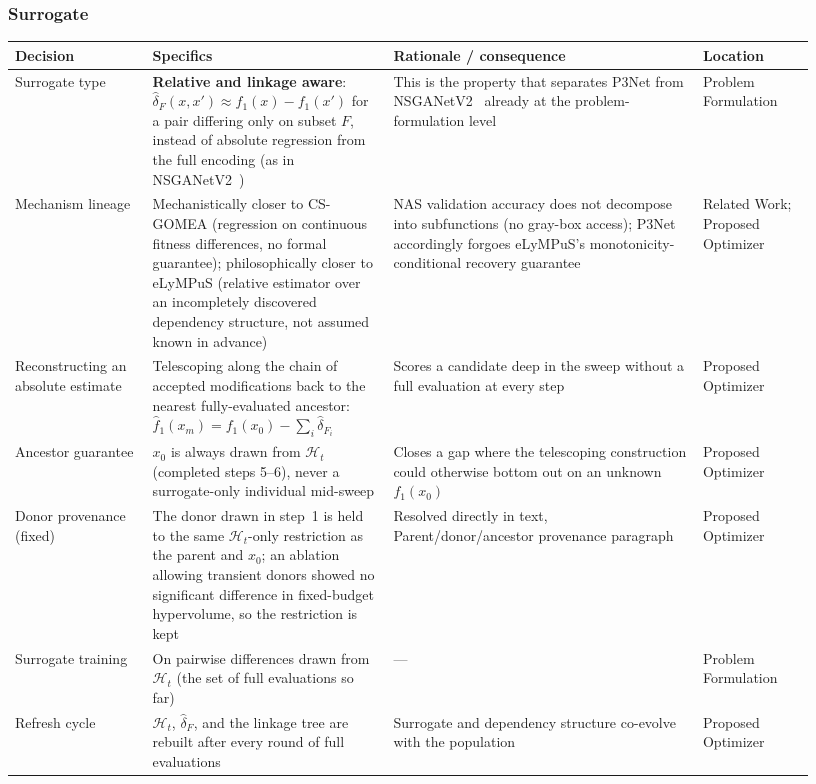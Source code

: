 \subsubsection*{Surrogate}
\begin{longtable}{p{0.16\linewidth} p{0.28\linewidth} p{0.36\linewidth} p{0.13\linewidth}}
\toprule
\textbf{Decision} & \textbf{Specifics} & \textbf{Rationale / consequence} & \textbf{Location} \\
\midrule
\endhead
Surrogate type & \textbf{Relative and linkage aware}: $\hat{\delta}_F(x,x')\approx f_1(x)-f_1(x')$ for a pair differing only on subset $F$, instead of absolute regression from the full encoding (as in NSGANetV2~\citep{lu2020nsganetv2}) & This is the property that separates P3Net from NSGANetV2~\citep{lu2020nsganetv2} already at the problem-formulation level & Problem Formulation \\
Mechanism lineage & Mechanistically closer to CS-GOMEA (regression on continuous fitness differences, no formal guarantee); philosophically closer to eLyMPuS (relative estimator over an incompletely discovered dependency structure, not assumed known in advance) & NAS validation accuracy does not decompose into subfunctions (no gray-box access); P3Net accordingly forgoes eLyMPuS's monotonicity-conditional recovery guarantee & Related Work; Proposed Optimizer \\
Reconstructing an absolute estimate & Telescoping along the chain of accepted modifications back to the nearest fully-evaluated ancestor: $\hat f_1(x_m)=f_1(x_0)-\sum_i\hat\delta_{F_i}$ & Scores a candidate deep in the sweep without a full evaluation at every step & Proposed Optimizer \\
Ancestor guarantee & $x_0$ is always drawn from $\mathcal{H}_t$ (completed steps 5--6), never a surrogate-only individual mid-sweep & Closes a gap where the telescoping construction could otherwise bottom out on an unknown $f_1(x_0)$ & Proposed Optimizer \\
Donor provenance (fixed) & The donor drawn in step~1 is held to the same $\mathcal{H}_t$-only restriction as the parent and $x_0$; an ablation allowing transient donors showed no significant difference in fixed-budget hypervolume, so the restriction is kept & Resolved directly in text, Parent/donor/ancestor provenance paragraph & Proposed Optimizer \\
Surrogate training & On pairwise differences drawn from $\mathcal{H}_t$ (the set of full evaluations so far) & --- & Problem Formulation \\
Refresh cycle & $\mathcal{H}_t$, $\hat\delta_F$, and the linkage tree are rebuilt after every round of full evaluations & Surrogate and dependency structure co-evolve with the population & Proposed Optimizer \\
\bottomrule
\end{longtable}

